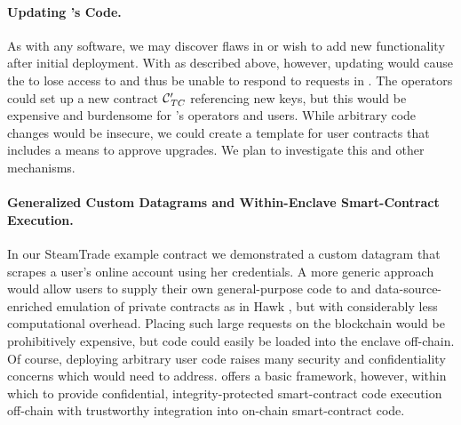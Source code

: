\paragraph{Updating \tc's Code.}
As with any software, we may discover flaws in \tc or wish to add new functionality after initial deployment.
With \tc as described above, however, updating \engine would cause the \encname to lose access to \skTC and thus be unable to respond to requests in \tcont.
The \tc operators could set up a new contract $\tcont'$ referencing new keys, but this would be expensive and burdensome for \tc's operators and users.
While arbitrary code changes would be insecure, we could create a template for user contracts that includes a means to approve upgrades.
We plan to investigate this and other mechanisms.

\paragraph{Generalized Custom Datagrams and Within-Enclave Smart-Contract Execution.}
In our {\sf SteamTrade} example contract we demonstrated a custom datagram that scrapes a user's online account using her credentials.
A more generic approach would allow users to supply their own general-purpose code to \tc and data-source-enriched emulation of private contracts as in Hawk \cite{hawk}, but with considerably less computational overhead.
Placing such large requests on the blockchain would be prohibitively expensive, but code could easily be loaded into the \tc enclave off-chain.
Of course, deploying arbitrary user code raises many security and confidentiality concerns which \tc would need to address. \tc offers a basic framework, however, within which to provide confidential, integrity-protected smart-contract code execution off-chain with trustworthy integration into on-chain smart-contract code.

